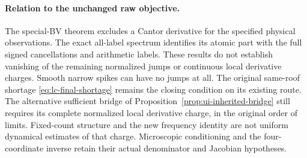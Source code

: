 \paragraph{Relation to the unchanged raw objective.}
The special-BV theorem excludes a Cantor derivative for the
specified physical observations. The exact all-label spectrum
identifies its atomic part with the full signed cancellations
and arithmetic labels. These results do not establish vanishing
of the remaining normalized jumps or continuous local derivative
charges. Smooth narrow spikes can have no jumps at all.
The original same-roof shortage \eqref{eq:lc-final-shortage}
remains the closing condition on its existing route.
The alternative sufficient bridge of
Proposition~\ref{prop:ui-inherited-bridge} still requires its
complete normalized local derivative charge, in the original
order of limits. Fixed-count structure and the new frequency
identity are not uniform dynamical estimates of that charge.
Microscopic conditioning and the four-coordinate inverse
retain their actual denominator and Jacobian hypotheses.

